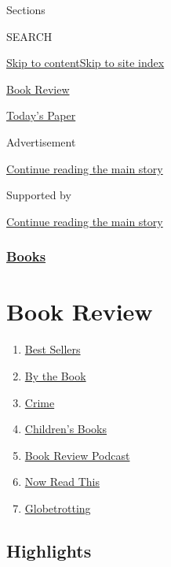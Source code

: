 Sections

SEARCH

\protect\hyperlink{site-content}{Skip to
content}\protect\hyperlink{site-index}{Skip to site index}

\href{https://www.nytimes3xbfgragh.onion/section/books/review}{Book
Review}

\href{https://myaccount.nytimes3xbfgragh.onion/auth/login?response_type=cookie\&client_id=vi}{}

\href{https://www.nytimes3xbfgragh.onion/section/todayspaper}{Today's
Paper}

Advertisement

\protect\hyperlink{after-top}{Continue reading the main story}

Supported by

\protect\hyperlink{after-sponsor}{Continue reading the main story}

\hypertarget{books}{%
\subsubsection{\texorpdfstring{\href{/section/books}{Books}}{Books}}\label{books}}

\hypertarget{book-review}{%
\section{Book Review}\label{book-review}}

\begin{enumerate}
\def\labelenumi{\arabic{enumi}.}
\tightlist
\item
  \href{/books/best-sellers/}{Best Sellers}
\item
  \href{/column/by-the-book}{By the Book}
\item
  \href{/column/crime}{Crime}
\item
  \href{/column/childrens-books}{Children's Books}
\item
  \href{/column/book-review-podcast}{Book Review Podcast}
\item
  \href{/spotlight/now-read-this}{Now Read This}
\item
  \href{/interactive/2020/01/08/books/new-books-international.html}{Globetrotting}
\end{enumerate}

\hypertarget{highlights}{%
\subsection{Highlights}\label{highlights}}

